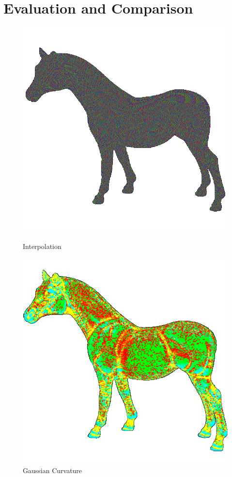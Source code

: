 \section{Evaluation and Comparison}
\begin{figure}[!htb]
    \includegraphics[width=\linewidth]{images/linear-horse.png}
    \caption{Interpolation}\label{fig:interpolation-horse}
  \endminipage\hfill
    \includegraphics[width=\linewidth]{images/gaussian-horse.png}
    \caption{Gaussian Curvature}\label{fig:gaussian-horse}
  \endminipage
  \end{figure}
